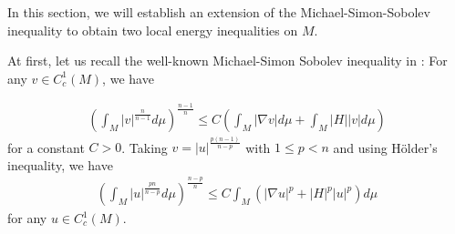 \documentclass{amsart}
\theoremstyle{definition}
\numberwithin{equation}{section}
\begin{document}
\newtheorem{e1}{Lemma}[section]
\newtheorem{e2}[e1]{Lemma}
\newtheorem{e3}[e1]{Lemma}
\newtheorem{e4}[e1]{Corollary}
In this section, we will establish an  extension of the Michael-Simon-Sobolev inequality to obtain two local energy inequalities on $M$.

At first, let us recall    the well-known
Michael-Simon Sobolev inequality in \cite{MS}: For any $v\in
C^{1}_{c}\left( M \right)$, we have

\begin{align}\label{MS}\left( \int_{M} |v|^{\frac {n}{n-1}} d\mu \right)^{\frac{n-1}{n}} \leq C \left( \int_{M} \left| \nabla v\right| d\mu +
\int_{M} \left| H \right| \left| v
\right| d\mu \right) \end{align}
 for a constant $C>0$.
Taking $v=|u|^{\frac {p(n-1)}{n-p}}$ with $1\leq p< n$ and using H\"older's inequality, we have
\begin{align}\label{MS2}
\left( \int_{M} |u|^{\frac {pn}{n-p}} d\mu \right)^{\frac{n-p}{n}} \leq C  \int_{M}\left( \left| \nabla u\right|^p + \left| H \right|^p \left|
u
\right|^p \right)d\mu   \end{align} for any $u\in
C^{1}_{c}\left( M \right)$.
\end{document}
